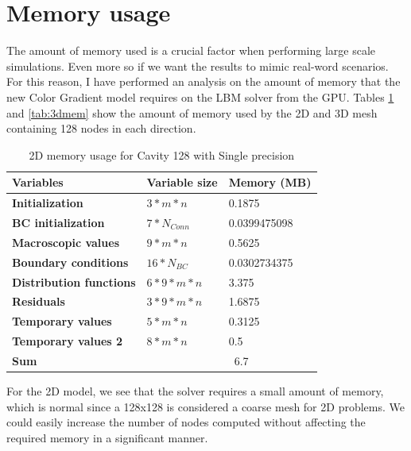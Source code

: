 \documentclass[12pt]{book}
\begin{document}
\section{Memory usage}
The amount of memory used is a crucial factor when performing large scale simulations. Even more so if we want the results to mimic real-word scenarios. For this reason, I have performed an analysis on the amount of memory that the new Color Gradient model requires on the LBM solver from the GPU. Tables \ref{tab:2dmem} and \ref{tab:3dmem} show the amount of memory used by the 2D and 3D mesh containing 128 nodes in each direction.
\begin{table}[H]
	\centering
	\begin{tabular}{|l|l|l|}
		\hline
		\textbf{Variables}              & \textbf{Variable size}   & \textbf{Memory (MB)} \\ \hline
		\textbf{Initialization}         & $3 * m * n$              & 0.1875               \\ \hline
		\textbf{BC initialization}      & $7 * N_{Conn}$           & 0.0399475098         \\ \hline
		\textbf{Macroscopic values}     & $9 * m * n$              & 0.5625               \\ \hline
		\textbf{Boundary conditions}    & $16 * N_{BC}$            & 0.0302734375         \\ \hline
		\textbf{Distribution functions} & $6 * 9 * m * n$          & 3.375                \\ \hline
		\textbf{Residuals}              & $3 * 9 * m * n$          & 1.6875               \\ \hline
		\textbf{Temporary values}       & $5 * m * n$              & 0.3125               \\ \hline
		\textbf{Temporary values 2}     & $8 * m * n $        	   & 0.5                    \\ \hline
		\textbf{Sum}                    &                          & ~6.7         \\ \hline
	\end{tabular}	
	\caption{2D memory usage for Cavity 128 with Single precision}
	\label{tab:2dmem}
\end{table}

For the 2D model, we see that the solver requires a small amount of memory, which is normal since a 128x128 is considered a coarse mesh for 2D problems. We could easily increase the number of nodes computed without affecting the required memory in a significant manner. 
\end{document}
